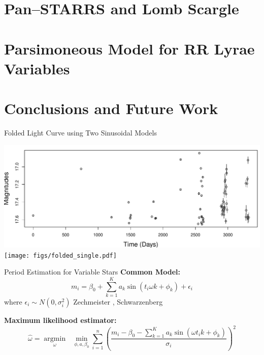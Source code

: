 \documentclass[12pt]{beamer}
\newcommand{\argmin}[1]{\underset{#1}{\operatorname{argmin}}\text{ }}
\begin{document}
\section{Pan--STARRS and Lomb Scargle}



\section{Parsimoneous Model for RR Lyrae Variables}

\section{Conclusions and Future Work}

\begin{frame}{Folded Light Curve using Two Sinusoidal Models}
\begin{center}
\includegraphics[scale=0.32]{figs/unfolded_single.pdf}\\
\texttt{[image: figs/folded\_single.pdf]}
\end{center}
\end{frame}

\begin{frame}{Period Estimation for Variable Stars}
\textbf{Common Model:} 
\begin{equation*}
m_i = \beta_0 + \sum_{k=1}^K a_k \sin(t_i\omega k + \phi_k) + \epsilon_i
\end{equation*}
where $\epsilon_i \sim N(0,\sigma_i^2)$ {\tiny Zechmeister \cite{zechmeister2009generalised}, Schwarzenberg \cite{schwarzenberg1996fast}}

\vspace{.2in}

\textbf{Maximum likelihood estimator:}
\begin{equation*}
\widehat{\omega} = \argmin{\omega} \min_{\phi,a,\beta_0} \sum_{i=1}^n\left(\frac{m_i - \beta_0 - \sum_{k=1}^K a_k\sin(\omega t_ik + \phi_k)}{\sigma_i}\right)^2
\end{equation*}
\end{frame}
\end{document}
